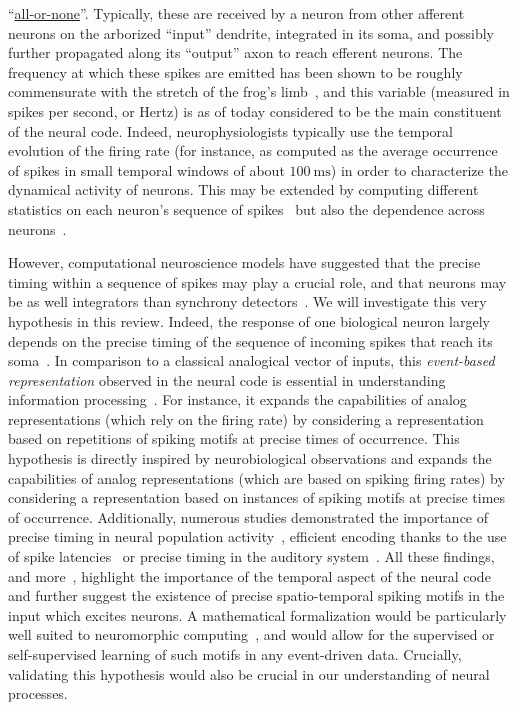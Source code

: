 \documentclass[brainsci, %
               review,submit,pdftex,moreauthors
               ]{Definitions/mdpi}
\newcommand{\ms}{\si{\milli\second}}%
\begin{document}
``\href{https://en.wikipedia.org/wiki/All-or-none_law}{all-or-none}''. Typically, these are received by a neuron from other afferent neurons on the arborized ``input'' dendrite, integrated in its soma, and possibly further propagated along its ``output'' axon to reach efferent neurons. The frequency at which these spikes are emitted has been shown to be roughly commensurate with the stretch of the frog's limb~\citep{adrian_impulses_1926}, and this variable (measured in spikes per second, or Hertz) is as of today considered to be the main constituent of the neural code. Indeed, neurophysiologists typically use the temporal evolution of the firing rate (for instance, as computed as the average occurrence of spikes in small temporal windows of about $100~\ms$) in order to characterize the dynamical activity of neurons. This may be extended by computing different statistics on each neuron's sequence of spikes~\citep{perkel_neuronal_1967} but also the dependence across neurons~\citep{perkel_neuronal_1967-1}. 

However, computational neuroscience models have suggested that the precise timing within a sequence of spikes may play a crucial role, and that neurons may be as well integrators than synchrony detectors~\citep{abeles_role_1982}. We will investigate this very hypothesis in this review. Indeed, the response of one biological neuron largely depends on the precise timing of the sequence of incoming spikes that reach its soma~\citep{paugam-moisy_computing_2012}. In comparison to a classical analogical vector of inputs, this \emph{event-based representation} observed in the neural code is essential in understanding information processing~\citep{carr_processing_1993}. For instance, it expands the capabilities of analog representations (which rely on the firing rate) by considering a representation based on repetitions of spiking motifs at precise times of occurrence. This hypothesis is directly inspired by neurobiological observations and expands the capabilities of analog representations (which are based on spiking firing rates) by considering a representation based on instances of spiking motifs at precise times of occurrence. Additionally, numerous studies demonstrated the importance of precise timing in neural population activity~\citep{davis_spontaneous_2021}, efficient encoding thanks to the use of spike latencies~\citep{perrinet_coding_2004,gollisch_rapid_2008} or precise timing in the auditory system~\citep{deweese_binary_2003,carr_circuit_1990}. All these findings, and more~\citep{bohte_evidence_2004}, highlight the importance of the temporal aspect of the neural code and further suggest the existence of precise spatio-temporal spiking motifs in the input which excites neurons.  A mathematical formalization would be particularly well suited to neuromorphic computing~\citep{roy_towards_2019}, and would allow for the supervised or self-supervised learning of such motifs in any event-driven data.  Crucially, validating this hypothesis would also be crucial in our understanding of neural processes. %
%
\end{document}
